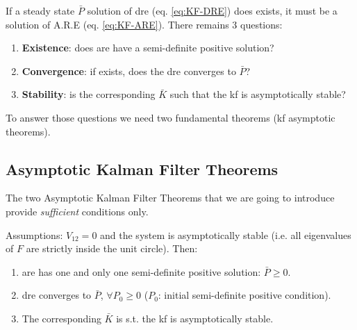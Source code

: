 If a steady state $\bar{P}$ solution of \gls{dre} (eq. \ref{eq:KF-DRE}) does exists, it must be a solution of A.R.E (eq. \ref{eq:KF-ARE}).
There remains 3 questions:
\begin{enumerate}
    \item \textbf{Existence}: does \gls{are} have a semi-definite positive solution?
    \item \textbf{Convergence}: if exists, does the \gls{dre} converges to $\bar{P}$?
    \item \textbf{Stability}: is the corresponding $\bar{K}$ such that the \gls{kf} is asymptotically stable?
\end{enumerate}


To answer those questions we need two fundamental theorems (\gls{kf} asymptotic theorems).

\subsection{Asymptotic Kalman Filter Theorems}
The two Asymptotic Kalman Filter Theorems that we are going to introduce provide \emph{sufficient} conditions only.

\begin{theorem}\label{th:1KF_as}
    Assumptions: $V_{12} = 0$ and the system is asymptotically stable (i.e. all eigenvalues of $F$ are strictly inside the unit circle).
    Then:
    \begin{enumerate}
        \item \gls{are} has one and only one semi-definite positive solution: $\bar{P} \ge 0$.
        \item \gls{dre} converges to $\bar{P}$, $\forall P_0 \ge 0$ ($P_0$: initial semi-definite positive condition).
        \item The corresponding $\bar{K}$ is s.t. the \gls{kf} is asymptotically stable.
    \end{enumerate}
\end{theorem}

